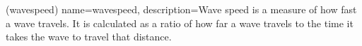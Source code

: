 \newglossaryentry(wavespeed)
{
     name=wavespeed,
     description={Wave speed is a measure of how fast a wave travels. It is calculated as a ratio of how far a wave travels to the time it takes the wave to travel that distance.}
     }
